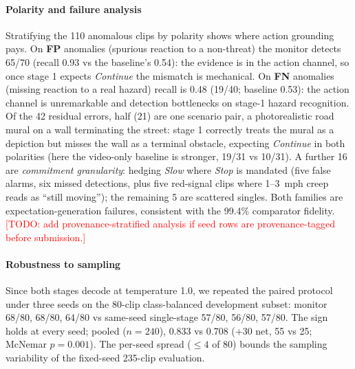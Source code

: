 \documentclass[conference]{IEEEtran}
\newcommand{\todo}[1]{\textcolor{red}{[TODO: #1]}}
\begin{document}
\paragraph{Polarity and failure analysis} Stratifying the 110 anomalous clips by polarity shows where action grounding pays. On \textbf{FP} anomalies (spurious reaction to a non-threat) the monitor detects 65/70 (recall 0.93 vs the baseline's 0.54): the evidence is in the action channel, so once stage 1 expects \emph{Continue} the mismatch is mechanical. On \textbf{FN} anomalies (missing reaction to a real hazard) recall is 0.48 (19/40; baseline 0.53): the action channel is unremarkable and detection bottlenecks on stage-1 hazard recognition. Of the 42 residual errors, half (21) are one scenario pair, a photorealistic road mural on a wall terminating the street: stage 1 correctly treats the mural as a depiction but misses the wall as a terminal obstacle, expecting \emph{Continue} in both polarities (here the video-only baseline is stronger, 19/31 vs 10/31). A further 16 are \emph{commitment granularity}: hedging \emph{Slow} where \emph{Stop} is mandated (five false alarms, six missed detections, plus five red-signal clips where 1--3~mph creep reads as ``still moving''); the remaining 5 are scattered singles. Both families are expectation-generation failures, consistent with the 99.4\% comparator fidelity. \todo{add provenance-stratified analysis if seed rows are provenance-tagged before submission.}

\paragraph{Robustness to sampling} Since both stages decode at temperature 1.0, we repeated the paired protocol under three seeds on the 80-clip class-balanced development subset: monitor 68/80, 68/80, 64/80 vs same-seed single-stage 57/80, 56/80, 57/80. The sign holds at every seed; pooled ($n = 240$), 0.833 vs 0.708 (+30 net, 55 vs 25; McNemar $p = 0.001$). The per-seed spread ($\leq 4$ of 80) bounds the sampling variability of the fixed-seed 235-clip evaluation.
\end{document}

